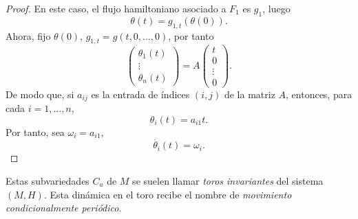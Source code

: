 \begin{proof}
En este caso, el flujo hamiltoniano asociado a $F_1$ es $g_1$, luego 
\[
\theta(t) = g_{1,t} (\theta(0)).
\]
Ahora, fijo $\theta(0)$, $g_{1,t}=g(t,0,\dots,0)$, por tanto
\[
\left(
\begin{array}{c}
\theta_1 (t)\\
\vdots \\
\theta_n (t)
\end{array}
\right)
=
A
\left(
\begin{array}{c}
t\\
0 \\
\vdots \\
0
\end{array}
\right).
\]
De modo que, si $a_{ij}$ es la entrada de índices $(i,j)$ de la matriz $A$, entonces, para cada $i=1,\dots,n$,
\[
\theta_i (t) = a_{i1} t.
\] 
Por tanto, sea $\omega_i=a_{i1}$,
\[
\dot{\theta_i}(t)=\omega_i.
\]
\end{proof}

\begin{obs}
  Estas subvariedades $C_a$ de $M$ se suelen llamar \textit{toros invariantes} del sistema $(M,H)$. 
  Esta dinámica en el toro recibe el nombre de \emph{movimiento condicionalmente periódico}.
\end{obs}

